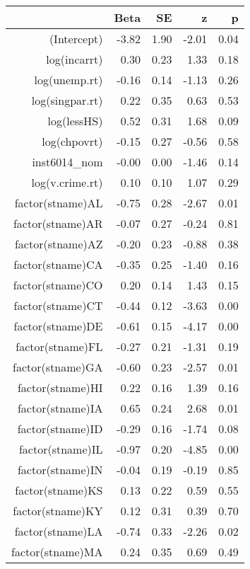 \begin{table}[ht]
\centering
\begin{tabular}{rrrrr}
  \hline
 & Beta & SE & z & p \\ 
  \hline
(Intercept) & -3.82 & 1.90 & -2.01 & 0.04 \\ 
  log(incarrt) & 0.30 & 0.23 & 1.33 & 0.18 \\ 
  log(unemp.rt) & -0.16 & 0.14 & -1.13 & 0.26 \\ 
  log(singpar.rt) & 0.22 & 0.35 & 0.63 & 0.53 \\ 
  log(lessHS) & 0.52 & 0.31 & 1.68 & 0.09 \\ 
  log(chpovrt) & -0.15 & 0.27 & -0.56 & 0.58 \\ 
  inst6014\_nom & -0.00 & 0.00 & -1.46 & 0.14 \\ 
  log(v.crime.rt) & 0.10 & 0.10 & 1.07 & 0.29 \\ 
  factor(stname)AL & -0.75 & 0.28 & -2.67 & 0.01 \\ 
  factor(stname)AR & -0.07 & 0.27 & -0.24 & 0.81 \\ 
  factor(stname)AZ & -0.20 & 0.23 & -0.88 & 0.38 \\ 
  factor(stname)CA & -0.35 & 0.25 & -1.40 & 0.16 \\ 
  factor(stname)CO & 0.20 & 0.14 & 1.43 & 0.15 \\ 
  factor(stname)CT & -0.44 & 0.12 & -3.63 & 0.00 \\ 
  factor(stname)DE & -0.61 & 0.15 & -4.17 & 0.00 \\ 
  factor(stname)FL & -0.27 & 0.21 & -1.31 & 0.19 \\ 
  factor(stname)GA & -0.60 & 0.23 & -2.57 & 0.01 \\ 
  factor(stname)HI & 0.22 & 0.16 & 1.39 & 0.16 \\ 
  factor(stname)IA & 0.65 & 0.24 & 2.68 & 0.01 \\ 
  factor(stname)ID & -0.29 & 0.16 & -1.74 & 0.08 \\ 
  factor(stname)IL & -0.97 & 0.20 & -4.85 & 0.00 \\ 
  factor(stname)IN & -0.04 & 0.19 & -0.19 & 0.85 \\ 
  factor(stname)KS & 0.13 & 0.22 & 0.59 & 0.55 \\ 
  factor(stname)KY & 0.12 & 0.31 & 0.39 & 0.70 \\ 
  factor(stname)LA & -0.74 & 0.33 & -2.26 & 0.02 \\ 
  factor(stname)MA & 0.24 & 0.35 & 0.69 & 0.49 \\ 

\end{tabular}
\end{table}
